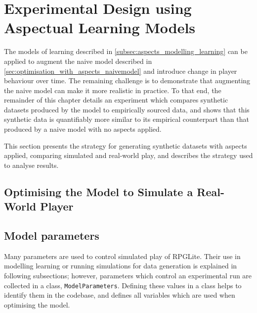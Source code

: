 \section{Experimental Design using Aspectual Learning Models}
\label{sec:optimisation_with_aspects_experimental_design}

The models of learning described in \cref{subsec:aspects_modelling_learning} can
be applied to augment the naive model described in
\cref{sec:optimisation_with_aspects_naivemodel} and introduce change in player
behaviour over time. The remaining challenge is to demonstrate that augmenting
the naive model can make it more realistic in practice. To that end, the
remainder of this chapter details an experiment which compares synthetic
datasets produced by the model to empirically sourced data, and shows that this
synthetic data is quantifiably more similar to its empirical counterpart than
that produced by a naive model with no aspects applied.

This section presents the strategy for generating synthetic datasets with
aspects applied, comparing simulated and real-world play, and describes the
strategy used to analyse results.


\subsection{Optimising the Model to Simulate a Real-World Player}


\subsection{Model parameters}
\label{subsec:exp1_model_parameters}

Many parameters are used to control simulated play of RPGLite. Their use in
modelling learning or running simulations for data generation is explained in
following subsections; however, parameters which control an experimental run are
collected in a class, \lstinline{ModelParameters}. Defining these values in a
class helps to identify them in the codebase, and defines all variables which
are used when optimising the model.

